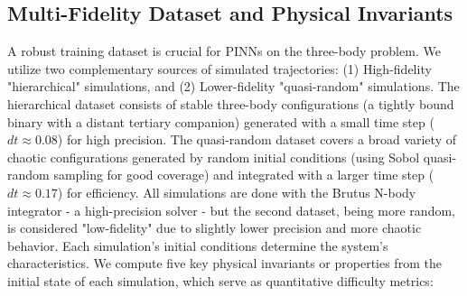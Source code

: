 \subsection{Multi-Fidelity Dataset and Physical Invariants}

A robust training dataset is crucial for PINNs on the three-body problem.  We utilize two complementary sources of simulated trajectories: (1) High-fidelity "hierarchical" simulations, and (2) Lower-fidelity "quasi-random" simulations.  The hierarchical dataset consists of stable three-body configurations (a tightly bound binary with a distant tertiary companion) generated with a small time step ($dt \approx 0.08$) for high precision.  The quasi-random dataset covers a broad variety of chaotic configurations generated by random initial conditions (using Sobol quasi-random sampling for good coverage) and integrated with a larger time step ($dt \approx 0.17$) for efficiency.  All simulations are done with the Brutus N-body integrator - a high-precision solver - but the second dataset, being more random, is considered "low-fidelity" due to slightly lower precision and more chaotic behavior.  Each simulation's initial conditions determine the system's characteristics. We compute five key physical invariants or properties from the initial state of each simulation, which serve as quantitative difficulty metrics: 

